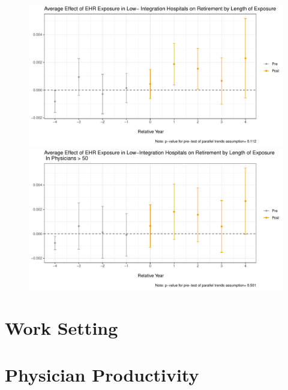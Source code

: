 \documentclass[11pt]{article}
\begin{document}
\begin{figure}[ht]
\caption{}
        \begin{minipage}[b]{0.47\linewidth}
            \centering
            \includegraphics[width=\textwidth]{Objects/ggdid_retire_allEHR_li.pdf}
        \end{minipage}
        \hspace{0.2cm}
        \begin{minipage}[b]{0.47\linewidth}
            \centering
            \includegraphics[width=\textwidth]{Objects/ggdid_retire_allEHR_old_li.pdf}
        \end{minipage}
        \label{fig:retiresecond}
\end{figure}



\section{Work Setting}

\section{Physician Productivity}
\end{document}
